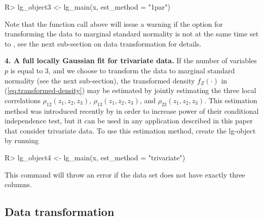 \begin{example}
R> lg_object3 <- lg_main(x, est_method = "1par")
\end{example}

Note that the function call above will issue a warning if the option for transforming the data to marginal standard normality is not at the same time set to , see the next sub-section on data transformation for details.

\textbf{4. A full locally Gaussian fit for trivariate data.} If the number of variables $p$ is equal to $3$, and we choose to transform the data to marginal standard normality (see the next sub-section), the transformed density $f_Z\left(\cdot\right)$ in (\ref{eq:transformed-density}) may be estimated by jointly estimating the three local correlations $\rho_{12}\left(z_1, z_2, z_3\right)$, $\rho_{13}\left(z_1, z_2, z_3\right)$, and $\rho_{23}\left(z_1, z_2, z_3\right)$. This estimation method was introduced recently by \citet{otne:tjos:2019} in order to increase power of their conditional independence test, but it can be used in any application described in this paper that consider trivariate data. To use this estimation method, create the lg-object by running

\begin{example}
R> lg_object4 <- lg_main(x, est_method = "trivariate")
\end{example}
This command will throw an error if the data set  does not have exactly three columns.

\subsection{Data transformation}
\label{data-transformation}

